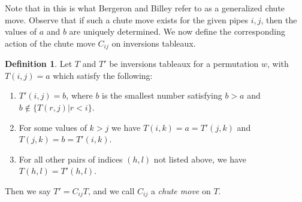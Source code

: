 \documentclass{article}
\theoremstyle{definition}
\newtheorem{definition}[theorem]{Definition} %
\begin{document}
Note that in \cite{billey1993some} this is what Bergeron and Billey refer to as a generalized chute move.
Observe that if such a chute move exists for the given pipes $i,j$, then the values of $a$ and $b$ are uniquely determined. We now define the corresponding action of the chute move $C_{ij}$ on inversions tableaux.



\begin{definition}
\label{Def:chute move}
Let $T$ and $T'$ be inversions tableaux for a permutation $w$, with $T(i,j)=a$ which satisfy the following:

    \begin{enumerate}
        \item $T'(i,j)=b$, where $b$ is the smallest number satisfying $b>a$ and $b \notin \{T(r,j) | r<i \}$.
        \item For some values of $k>j$ we have $T(i,k) = a = T'(j,k)$ and $T(j,k) = b = T'(i,k)$.
        \item For all other pairs of indices $(h,l)$ not listed above, we have $T(h,l) = T'(h,l)$.
    \end{enumerate}

Then we say $T' = C_{ij} T$, and we call $C_{ij}$ a \emph{chute move} on $T$.
\end{definition}
\end{document}
